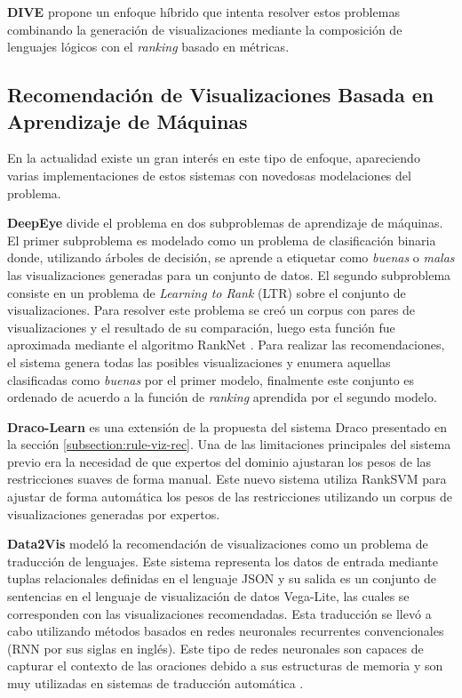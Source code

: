 \textbf{DIVE} \cite{hu2018dive} propone un enfoque h\'ibrido que intenta resolver estos problemas combinando
la generaci\'on de visualizaciones mediante la composici\'on de lenguajes l\'ogicos con el \textit{ranking} basado en m\'etricas. 

\subsection{Recomendaci\'on de Visualizaciones Basada en Aprendizaje de M\'aquinas}\label{subsection:ml-viz-rec}
En la actualidad existe un gran inter\'es en este tipo de enfoque, apareciendo varias implementaciones
de estos sistemas con novedosas modelaciones del problema. 

\textbf{DeepEye} \cite{luo2018deepeye} divide el problema en dos subproblemas de aprendizaje de m\'aquinas. El primer subproblema es modelado
como un problema de clasificaci\'on binaria donde, utilizando \'arboles de decisi\'on, se aprende a etiquetar 
como \textit{buenas} o \textit{malas} las visualizaciones generadas para un conjunto de datos. 
El segundo subproblema consiste en un problema de \textit{Learning to Rank} (LTR) sobre el conjunto de visualizaciones. 
Para resolver este problema se cre\'o un corpus con pares de visualizaciones y el resultado de su comparaci\'on, luego esta funci\'on fue aproximada
mediante el algoritmo RankNet \cite{luo2018deepeye}. Para realizar las recomendaciones, el sistema genera todas las posibles visualizaciones y enumera
aquellas clasificadas como \textit{buenas} por el primer modelo, finalmente este conjunto es ordenado de acuerdo a la funci\'on de \textit{ranking} aprendida por
el segundo modelo. 

 

\textbf{Draco-Learn} \cite{moritz2018draco} es una extensi\'on de la propuesta del sistema Draco presentado en la
secci\'on \ref{subsection:rule-viz-rec}. Una de las limitaciones principales del sistema previo era la necesidad
de que expertos del dominio ajustaran los pesos de las restricciones suaves de forma manual. Este nuevo sistema
utiliza RankSVM para ajustar de forma autom\'atica los pesos de las restricciones utilizando un corpus de visualizaciones
generadas por expertos.


\textbf{Data2Vis} \cite{dibia2019data2vis} model\'o la recomendaci\'on de visualizaciones como un problema de
traducci\'on de lenguajes. Este sistema representa los datos de entrada mediante tuplas
relacionales definidas en el lenguaje JSON y su salida es un conjunto de sentencias
en el lenguaje de visualizaci\'on de datos Vega-Lite, las cuales se corresponden con las
visualizaciones recomendadas. Esta traducci\'on se llev\'o a cabo utilizando m\'etodos
basados en redes neuronales recurrentes convencionales (RNN por sus siglas en ingl\'es).
Este tipo de redes neuronales son capaces de capturar el contexto de las oraciones debido
a sus estructuras de memoria y son muy utilizadas en sistemas de traducci\'on autom\'atica \cite{sutskever2014sequence}.

